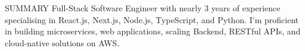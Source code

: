 \documentclass{resume} %
\begin{document}

\begin{rSection}{SUMMARY}
 \vspace{-2pt}
Full-Stack Software Engineer with nearly 3 years of experience specialising in React.js, Next.js, Node.js, TypeScript, and Python. I'm proficient in building microservices, web applications, scaling Backend, RESTful APIs, and cloud-native solutions on AWS.
\end{rSection}
 \vspace{-5pt}
\end{document}
